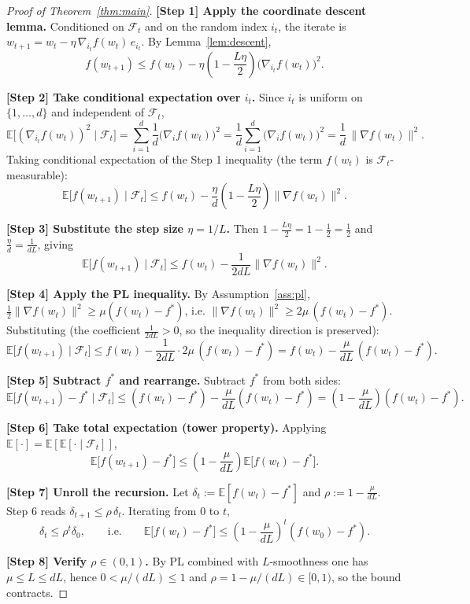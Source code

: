 \documentclass{article}
\begin{document}
\begin{proof}[Proof of Theorem~\ref{thm:main}]

\textbf{[Step 1] Apply the coordinate descent lemma.}
Conditioned on $\mathcal{F}_t$ and on the random index $i_t$, the iterate is
$w_{t+1} = w_t - \eta\,\nabla_{i_t} f(w_t)\,e_{i_t}$. By
Lemma~\ref{lem:descent},
\[
f(w_{t+1}) \le f(w_t) - \eta\left(1 - \frac{L\eta}{2}\right)\big(\nabla_{i_t} f(w_t)\big)^2 .
\]

\textbf{[Step 2] Take conditional expectation over $i_t$.}
Since $i_t$ is uniform on $\{1,\dots,d\}$ and independent of $\mathcal{F}_t$,
\[
\mathbb{E}\big[(\nabla_{i_t} f(w_t))^2 \mid \mathcal{F}_t\big]
= \sum_{i=1}^{d} \frac{1}{d}\big(\nabla_i f(w_t)\big)^2
= \frac{1}{d}\sum_{i=1}^{d}\big(\nabla_i f(w_t)\big)^2
= \frac{1}{d}\,\|\nabla f(w_t)\|^2 .
\]
Taking conditional expectation of the Step 1 inequality (the term $f(w_t)$ is
$\mathcal{F}_t$-measurable):
\[
\mathbb{E}\big[f(w_{t+1}) \mid \mathcal{F}_t\big]
\le f(w_t) - \frac{\eta}{d}\left(1 - \frac{L\eta}{2}\right)\|\nabla f(w_t)\|^2 .
\]

\textbf{[Step 3] Substitute the step size $\eta = 1/L$.}
Then $1 - \tfrac{L\eta}{2} = 1 - \tfrac{1}{2} = \tfrac{1}{2}$ and
$\tfrac{\eta}{d} = \tfrac{1}{dL}$, giving
\[
\mathbb{E}\big[f(w_{t+1}) \mid \mathcal{F}_t\big]
\le f(w_t) - \frac{1}{2dL}\|\nabla f(w_t)\|^2 .
\]

\textbf{[Step 4] Apply the PL inequality.}
By Assumption~\ref{ass:pl}, $\tfrac{1}{2}\|\nabla f(w_t)\|^2 \ge \mu(f(w_t)-f^*)$,
i.e. $\|\nabla f(w_t)\|^2 \ge 2\mu\,(f(w_t)-f^*)$. Substituting (the coefficient
$\tfrac{1}{2dL}>0$, so the inequality direction is preserved):
\[
\mathbb{E}\big[f(w_{t+1}) \mid \mathcal{F}_t\big]
\le f(w_t) - \frac{1}{2dL}\cdot 2\mu\,(f(w_t)-f^*)
= f(w_t) - \frac{\mu}{dL}\,(f(w_t)-f^*).
\]

\textbf{[Step 5] Subtract $f^*$ and rearrange.}
Subtract $f^*$ from both sides:
\[
\mathbb{E}\big[f(w_{t+1}) - f^* \mid \mathcal{F}_t\big]
\le (f(w_t)-f^*) - \frac{\mu}{dL}(f(w_t)-f^*)
= \left(1 - \frac{\mu}{dL}\right)(f(w_t)-f^*).
\]

\textbf{[Step 6] Take total expectation (tower property).}
Applying $\mathbb{E}[\cdot] = \mathbb{E}[\mathbb{E}[\cdot \mid \mathcal{F}_t]]$,
\[
\mathbb{E}\big[f(w_{t+1}) - f^*\big]
\le \left(1 - \frac{\mu}{dL}\right)\mathbb{E}\big[f(w_t)-f^*\big].
\]

\textbf{[Step 7] Unroll the recursion.}
Let $\delta_t := \mathbb{E}[f(w_t)-f^*]$ and $\rho := 1 - \tfrac{\mu}{dL}$.
Step 6 reads $\delta_{t+1} \le \rho\,\delta_t$. Iterating from $0$ to $t$,
\[
\delta_t \le \rho^t \delta_0,
\qquad\text{i.e.}\qquad
\mathbb{E}\big[f(w_t)-f^*\big] \le \left(1 - \frac{\mu}{dL}\right)^t (f(w_0)-f^*).
\]

\textbf{[Step 8] Verify $\rho \in (0,1)$.}
By PL combined with $L$-smoothness one has $\mu \le L \le dL$, hence
$0 < \mu/(dL) \le 1$ and $\rho = 1-\mu/(dL) \in [0,1)$, so the bound contracts.
\end{proof}
\end{document}

